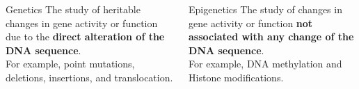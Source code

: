 \documentclass[slidestop,compress,11pt,xcolor=dvipsnames]{beamer}
\begin{document}
\begin{frame}
\begin{columns}
     \begin{column}{.48\textwidth} %
     \begin{block}{Genetics}
     The study of heritable changes in gene activity or function due to the \textbf{direct alteration of the DNA sequence}.
     \\For example, point mutations, deletions, insertions, and translocation.
     \end{block}
     \end{column}%
     \hfill%
     \begin{column}{.48 \textwidth} %
     \begin{alertblock}{Epigenetics}
     The study of changes in gene activity or function \textbf{not associated with any change of the DNA sequence}.\\ For example, DNA methylation and Histone modifications.
     \end{alertblock}
     \end{column}
   \end{columns}

\end{frame}
\end{document}
